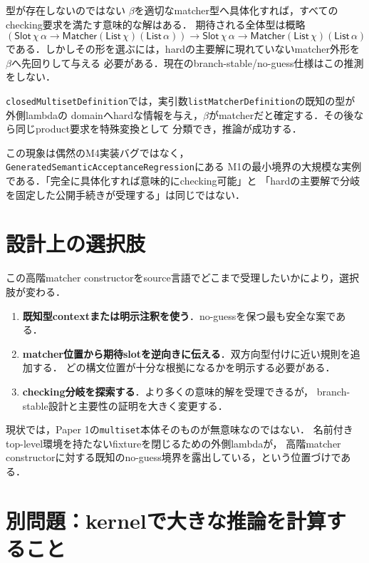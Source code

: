 \documentclass[11pt,a4paper,oneside]{ltjsbook}
\newcommand{\code}[1]{\texttt{#1}}
\newcommand{\Matcher}{\mathsf{Matcher}}
\newcommand{\Slot}{\mathsf{Slot}}
\newcommand{\fn}{\mathbin{\to}}
\begin{document}
\begin{pointbox}{型が存在しないのではない}
$\beta$を適切なmatcher型へ具体化すれば，すべてのchecking要求を満たす意味的な解はある．
期待される全体型は概略
\[
  (\Slot\,\chi\,\alpha\fn
    \Matcher(\mathsf{List}\,\chi)(\mathsf{List}\,\alpha))
  \fn
  \Slot\,\chi\,\alpha\fn
    \Matcher(\mathsf{List}\,\chi)(\mathsf{List}\,\alpha)
\]
である．しかしその形を選ぶには，hardの主要解に現れていないmatcher外形を$\beta$へ先回りして与える
必要がある．現在のbranch-stable/no-guess仕様はこの推測をしない．
\end{pointbox}

\code{closedMultisetDefinition}では，実引数\code{listMatcherDefinition}の既知の型が外側lambdaの
domainへhardな情報を与え，$\beta$がmatcherだと確定する．その後なら同じproduct要求を特殊変換として
分類でき，推論が成功する．

この現象は偶然のM4実装バグではなく，\code{GeneratedSemanticAcceptanceRegression}にある
M1の最小境界の大規模な実例である．「完全に具体化すれば意味的にchecking可能」と
「hardの主要解で分岐を固定した公開手続きが受理する」は同じではない．

\section{設計上の選択肢}

この高階matcher constructorをsource言語でどこまで受理したいかにより，選択肢が変わる．

\begin{enumerate}[leftmargin=2em]
  \item \textbf{既知型contextまたは明示注釈を使う}．no-guessを保つ最も安全な案である．
  \item \textbf{matcher位置から期待slotを逆向きに伝える}．双方向型付けに近い規則を追加する．
        どの構文位置が十分な根拠になるかを明示する必要がある．
  \item \textbf{checking分岐を探索する}．より多くの意味的解を受理できるが，
        branch-stable設計と主要性の証明を大きく変更する．
\end{enumerate}

現状では，Paper 1の\code{multiset}本体そのものが無意味なのではない．
名前付きtop-level環境を持たないfixtureを閉じるための外側lambdaが，
高階matcher constructorに対する既知のno-guess境界を露出している，という位置づけである．

\section{別問題：kernelで大きな推論を計算すること}
\end{document}
